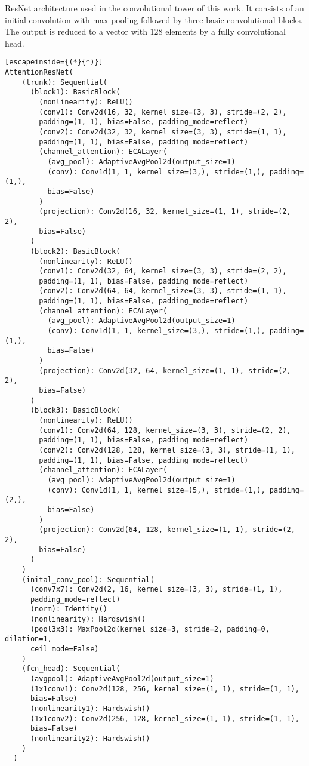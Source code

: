ResNet architecture used in the convolutional tower of this work. It consists of an initial convolution with max pooling followed by three basic convolutional blocks. The output is reduced to a vector with $128$ elements by a fully convolutional head.
\label{code:cnn}\begin{lstlisting}[escapeinside={(*}{*)}]
AttentionResNet(
    (trunk): Sequential(
      (block1): BasicBlock(
        (nonlinearity): ReLU()
        (conv1): Conv2d(16, 32, kernel_size=(3, 3), stride=(2, 2), 
        padding=(1, 1), bias=False, padding_mode=reflect)
        (conv2): Conv2d(32, 32, kernel_size=(3, 3), stride=(1, 1), 
        padding=(1, 1), bias=False, padding_mode=reflect)
        (channel_attention): ECALayer(
          (avg_pool): AdaptiveAvgPool2d(output_size=1)
          (conv): Conv1d(1, 1, kernel_size=(3,), stride=(1,), padding=(1,), 
          bias=False)
        )
        (projection): Conv2d(16, 32, kernel_size=(1, 1), stride=(2, 2), 
        bias=False)
      )
      (block2): BasicBlock(
        (nonlinearity): ReLU()
        (conv1): Conv2d(32, 64, kernel_size=(3, 3), stride=(2, 2), 
        padding=(1, 1), bias=False, padding_mode=reflect)
        (conv2): Conv2d(64, 64, kernel_size=(3, 3), stride=(1, 1), 
        padding=(1, 1), bias=False, padding_mode=reflect)
        (channel_attention): ECALayer(
          (avg_pool): AdaptiveAvgPool2d(output_size=1)
          (conv): Conv1d(1, 1, kernel_size=(3,), stride=(1,), padding=(1,), 
          bias=False)
        )
        (projection): Conv2d(32, 64, kernel_size=(1, 1), stride=(2, 2), 
        bias=False)
      )
      (block3): BasicBlock(
        (nonlinearity): ReLU()
        (conv1): Conv2d(64, 128, kernel_size=(3, 3), stride=(2, 2), 
        padding=(1, 1), bias=False, padding_mode=reflect)
        (conv2): Conv2d(128, 128, kernel_size=(3, 3), stride=(1, 1), 
        padding=(1, 1), bias=False, padding_mode=reflect)
        (channel_attention): ECALayer(
          (avg_pool): AdaptiveAvgPool2d(output_size=1)
          (conv): Conv1d(1, 1, kernel_size=(5,), stride=(1,), padding=(2,), 
          bias=False)
        )
        (projection): Conv2d(64, 128, kernel_size=(1, 1), stride=(2, 2), 
        bias=False)
      )
    )
    (inital_conv_pool): Sequential(
      (conv7x7): Conv2d(2, 16, kernel_size=(3, 3), stride=(1, 1), 
      padding_mode=reflect)
      (norm): Identity()
      (nonlinearity): Hardswish()
      (pool3x3): MaxPool2d(kernel_size=3, stride=2, padding=0, dilation=1,
      ceil_mode=False)
    )
    (fcn_head): Sequential(
      (avgpool): AdaptiveAvgPool2d(output_size=1)
      (1x1conv1): Conv2d(128, 256, kernel_size=(1, 1), stride=(1, 1), 
      bias=False)
      (nonlinearity1): Hardswish()
      (1x1conv2): Conv2d(256, 128, kernel_size=(1, 1), stride=(1, 1), 
      bias=False)
      (nonlinearity2): Hardswish()
    )
  )
\end{lstlisting}

